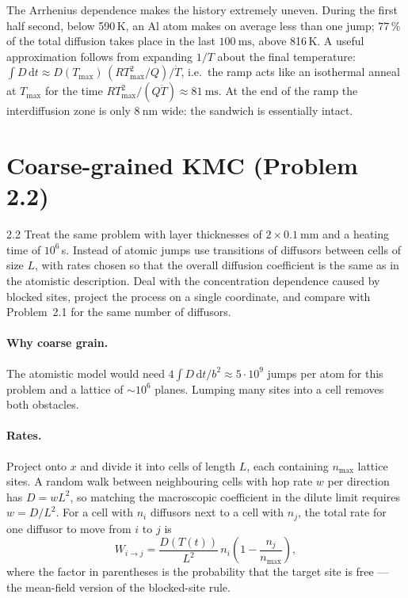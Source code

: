 \documentclass[11pt,a4paper]{article}
\numberwithin{equation}{section}
\theoremstyle{remark}
\begin{document}
The Arrhenius dependence makes the history extremely uneven. During the first half second, below
590\,K, an Al atom makes on average less than one jump; $77\,\%$ of the total diffusion takes place in
the last $\SI{100}{\milli\second}$, above 816\,K. A useful approximation follows from expanding
$1/T$ about the final temperature:
$\int D\,\mathrm{d}t \approx D(T_{\max})\,(RT_{\max}^2/Q)/\dot T$, i.e.\ the ramp acts like an isothermal
anneal at $T_{\max}$ for the time $RT_{\max}^2/(Q\dot T) \approx \SI{81}{\milli\second}$. At the end of
the ramp the interdiffusion zone is only $\SI{8}{\nano\metre}$ wide: the sandwich is essentially intact.

\section{Coarse-grained KMC (Problem 2.2)}\label{sec:coarse}

\begin{task}{2.2}
  Treat the same problem with layer thicknesses of $2\times\SI{0.1}{\milli\metre}$ and a heating time of
  $10^6$\,s. Instead of atomic jumps use transitions of diffusors between cells of size $L$, with rates
  chosen so that the overall diffusion coefficient is the same as in the atomistic description. Deal
  with the concentration dependence caused by blocked sites, project the process on a single
  coordinate, and compare with Problem~2.1 for the same number of diffusors.
\end{task}

\paragraph{Why coarse grain.}
The atomistic model would need $4\int D\,\mathrm{d}t/b^2 \approx 5\cdot10^{9}$ jumps per atom for this
problem and a lattice of $\sim10^{6}$ planes. Lumping many sites into a cell removes both obstacles.

\paragraph{Rates.}
Project onto $x$ and divide it into cells of length $L$, each containing $n_{\max}$ lattice sites. A
random walk between neighbouring cells with hop rate $w$ per direction has $D = wL^2$, so matching the
macroscopic coefficient in the dilute limit requires $w = D/L^2$. For a cell with $n_i$ diffusors next
to a cell with $n_j$, the total rate for one diffusor to move from $i$ to $j$ is
\begin{equation}\label{eq:cgrate}
  W_{i\to j} = \frac{D(T(t))}{L^2}\,n_i\left(1 - \frac{n_j}{n_{\max}}\right),
\end{equation}
where the factor in parentheses is the probability that the target site is free --- the mean-field
version of the blocked-site rule.
\end{document}
